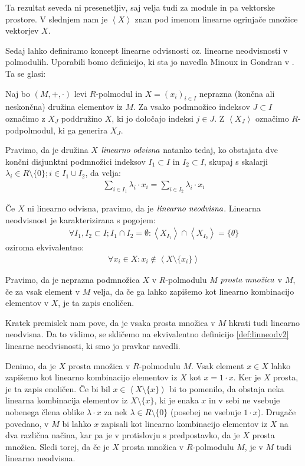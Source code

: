 \documentclass[mat1]{fmfdelo}
\newcommand{\pojem}[1]{\ensuremath{\emph{#1}}}
\newcommand{\Gen}[1]{\ensuremath{\left<{#1}\right>}}
\begin{document}
Ta rezultat seveda ni presenetljiv, saj velja tudi za module in pa vektorske prostore. V slednjem nam je \Gen{X} znan pod imenom linearne ogrinjače množice vektorjev $X$.

Sedaj lahko definiramo koncept linearne odvisnosti oz. linearne neodvisnosti v polmodulih. Uporabili bomo definicijo, ki sta jo navedla Minoux in Gondran v \cite{bib:Gondran}. Ta se glasi:

\begin{definicija}
	Naj bo $(M, +, \cdot)$ levi $R$-polmodul in $X = (x_i)_{i \in I}$ neprazna (končna ali neskončna) družina elementov iz $M$. Za vsako podmnožico indeksov $J \subset I$ označimo z $X_J$ poddružino $X$, ki jo določajo indeksi $j\in J$. Z $\Gen{X_J}$ označimo $R$-podpolmodul, ki ga generira $X_J$.
	
	Pravimo, da je družina $X$ \pojem{linearno odvisna} natanko tedaj, ko obstajata dve končni disjunktni podmnožici indeksov $I_1\subset I$ in $I_2\subset I$, skupaj s skalarji $\lambda_i \in R\setminus\{0\}; i\in I_1\cup I_2$, da velja: \begin{align*}
		\sum_{i \in I_1}\lambda_i\cdot x_i = \sum_{i \in I_2}\lambda_i\cdot x_i 
	\end{align*}

	Če $X$ ni linearno odvisna, pravimo, da je \pojem{linearno neodvisna}. Linearna neodvisnost je karakterizirana s pogojem: \begin{align}
		\forall I_1, I_2 \subset I; I_1\cap I_2 =\emptyset: \Gen{X_{I_1}}\cap\Gen{X_{I_2}} = \{\theta\}
	\end{align}
oziroma ekvivalentno: \begin{align}\label{def:linneodv2}
	\forall x_i\in X: x_i \notin \Gen{X\setminus\{x_i\}}
\end{align}

Pravimo, da je neprazna podmnožica $X$ v $R$-polmodulu $M$ \pojem{prosta množica} v $M$, če za vsak element v $M$ velja, da če ga lahko zapišemo kot linearno kombinacijo elementov v $X$, je ta zapis enoličen. 

\end{definicija}

Kratek premislek nam pove, da je vsaka prosta množica v $M$ hkrati tudi linearno neodvisna. Da to vidimo, se skličemo na ekvivalentno definicijo \ref{def:linneodv2} linearne neodvisnosti, ki smo jo pravkar navedli.

Denimo, da je $X$ prosta množica v $R$-polmodulu $M$. Vsak element $x\in X$ lahko zapišemo kot linearno kombinacijo elementov iz $X$ kot $x = 1\cdot x$. Ker je $X$ prosta, je ta zapis enoličen. Če bi bil $x \in\Gen{X\setminus\{x\}}$ bi to pomenilo, da obstaja neka linearna kombinacija elementov iz $X\setminus\{x\}$, ki je enaka $x$ in v sebi ne vsebuje nobenega člena oblike $\lambda\cdot x$ za nek $\lambda\in R\setminus\{0\}$ (posebej ne vsebuje $1\cdot x$). Drugače povedano, v $M$ bi lahko $x$ zapisali kot linearno kombinacijo elementov iz $X$ na dva različna načina, kar pa je v protislovju s predpostavko, da je $X$ prosta množica. Sledi torej, da če je $X$ prosta množica v $R$-polmodulu $M$, je v $M$ tudi linearno neodvisna.
\end{document}
